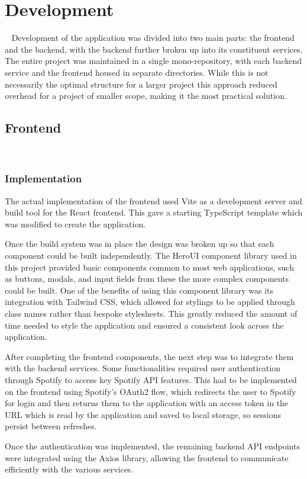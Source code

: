 \chapter{Development}~\label{cha:development}
Development of the application was divided into two main parts: the frontend and the backend, with the backend further broken up into its constituent services. The entire project was maintained in a single mono-repository, with each backend service and the frontend housed in separate directories. While this is not necessarily the optimal structure for a larger project this approach reduced overhead for a project of smaller scope, making it the most practical solution.

\section{Frontend}~\label{sec:frontend-development}
\subsection{Implementation}
The actual implementation of the frontend used Vite as a development server and build tool for the React frontend. This gave a starting TypeScript template which was modified to create the application.

Once the build system was in place the design was broken up so that each component could be built independently. The HeroUI component library used in this project provided basic components common to most web applications, such as buttons, modals, and input fields from these the more complex components could be built. One of the benefits of using this component library was its integration with Tailwind CSS, which allowed for stylings to be applied through class names rather than bespoke stylesheets. This greatly reduced the amount of time needed to style the application and ensured a consistent look across the application.

After completing the frontend components, the next step was to integrate them with the backend services. Some functionalities required user authentication through Spotify to access key Spotify API features. This had to be implemented on the frontend using Spotify’s OAuth2 flow, which redirects the user to Spotify for login and then returns them to the application with an access token in the URL which is read by the application and saved to local storage, so sessions persist between refreshes.

Once the authentication was implemented, the remaining backend API endpoints were integrated using the Axios library, allowing the frontend to communicate efficiently with the various services.

